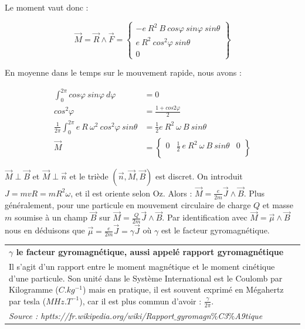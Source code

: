 \documentclass[12pt,a4paper,titlepage]{book}
\begin{document}
Le moment vaut donc :

\begin{center}
\[
\overrightarrow{M} = \overrightarrow{R} \wedge \overrightarrow{F} =
\left\lbrace
\begin{matrix}
-e ~R^2 ~B ~cos \varphi ~sin \varphi ~sin \theta\\
e ~R^2 ~cos^2 \varphi ~sin \theta\\
0
\end{matrix}
\right\rbrace
\]
\end{center}

En moyenne dans le temps sur le mouvement rapide, nous avons :

\begin{align*}
\int_0^{2\pi} cos \varphi ~sin \varphi ~d \varphi &= 0\\
cos^2 \varphi &= \frac{1 + cos 2 \varphi}{2}\\
\frac{1}{2\pi} \int_0^{2\pi} e~R~\omega^2~cos^2 \varphi~sin \theta &= \frac{1}{2} e ~R^2 ~\omega ~B ~sin \theta\\
\overrightarrow{M} &= 
\left\lbrace
\begin{matrix}
0 & \frac{1}{2} ~e ~R^2 ~\omega ~B ~sin \theta & 0\\
\end{matrix}
\right\rbrace
\end{align*}

$\overrightarrow{M} \perp \overrightarrow{B}$ et $\overrightarrow{M} \perp \overrightarrow{n}$ et le triède $\left( \overrightarrow{n}, \overrightarrow{M}, \overrightarrow{B} \right)$ est discret. On introduit $J = mvR = mR^2 \omega$, et il est oriente selon Oz. Alors : $\overrightarrow{M} = \frac{e}{2m} \overrightarrow{J} \wedge \overrightarrow{B}$. Plus généralement, pour une particule en mouvement circulaire de charge $Q$ et masse $m$ soumise à un champ $\overrightarrow{B}$ sur $\overrightarrow{M} = \frac{Q}{2m} \overrightarrow{J} \wedge \overrightarrow{B}$. Par identification avec $\overrightarrow{M} = \overrightarrow{\mu} \wedge \overrightarrow{B}$ nous en déduisons que $\overrightarrow{\mu} = \frac{e}{2m} \overrightarrow{J} = \gamma \overrightarrow{J}$ où $\gamma$ est le facteur gyromagnétique.\\

\begin{tabular}{|p{15cm}|}
\hline
\textbf{$\gamma$ le facteur gyromagnétique, aussi appelé rapport gyromagnétique}\\

Il s'agit d'un rapport entre le moment magnétique et le moment cinétique d'une particule. Son unité dans le Système International est le Coulomb par Kilogramme ($C.kg^{-1}$) mais en pratique, il est souvent exprimé en Mégahertz par tesla ($MHz.T^{-1}$), car il est plus commun d'avoir : $\frac{\gamma}{2\pi}$.\\

\textit{Source : hptts://fr.wikipedia.org/wiki/Rapport$\_$gyromagn$\%$C3$\%$A9tique}\\
\hline
\end{tabular}\\
\end{document}
